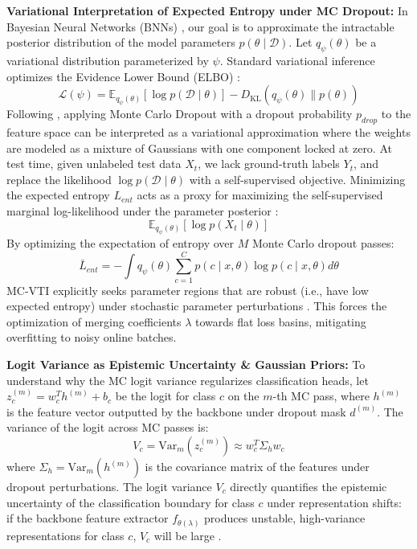 \documentclass{article}
\theoremstyle{plain}
\theoremstyle{definition}
\theoremstyle{remark}
\begin{document}
\textbf{Variational Interpretation of Expected Entropy under MC Dropout:}
In Bayesian Neural Networks (BNNs) \cite{gal2015bayesian,zhou2025bayesian}, our goal is to approximate the intractable posterior distribution of the model parameters $p(\theta \mid \mathcal{D})$. Let $q_\psi(\theta)$ be a variational distribution parameterized by $\psi$. Standard variational inference optimizes the Evidence Lower Bound (ELBO) \cite{gelberg2024variational,hubin2023variational,huix2022variational}:
\begin{equation}
  \mathcal{L}(\psi) = \mathbb{E}_{q_\psi(\theta)} [ \log p(\mathcal{D} \mid \theta) ] - D_{\text{KL}}(q_\psi(\theta) \parallel p(\theta))
\end{equation}
Following \cite{gal2015bayesian}, applying Monte Carlo Dropout with a dropout probability $p_{drop}$ to the feature space can be interpreted as a variational approximation where the weights are modeled as a mixture of Gaussians with one component locked at zero. 
At test time, given unlabeled test data $X_t$, we lack ground-truth labels $Y_t$, and replace the likelihood $\log p(\mathcal{D} \mid \theta)$ with a self-supervised objective. Minimizing the expected entropy $L_{ent}$ acts as a proxy for maximizing the self-supervised marginal log-likelihood under the parameter posterior \cite{lee2024entropy}:
\begin{equation}
  \mathbb{E}_{q_\psi(\theta)} [ \log p(X_t \mid \theta) ]
\end{equation}
By optimizing the expectation of entropy over $M$ Monte Carlo dropout passes:
\begin{equation}
  \bar{L}_{ent} = -\int q_\psi(\theta) \sum_{c=1}^C p(c \mid x, \theta) \log p(c \mid x, \theta) d\theta
\end{equation}
MC-VTI explicitly seeks parameter regions that are robust (i.e., have low expected entropy) under stochastic parameter perturbations \cite{guo2025smoothing,schodt2024framework}. This forces the optimization of merging coefficients $\lambda$ towards flat loss basins, mitigating overfitting to noisy online batches.

\textbf{Logit Variance as Epistemic Uncertainty \& Gaussian Priors:}
To understand why the MC logit variance regularizes classification heads, let $z^{(m)}_c = w_c^T h^{(m)} + b_c$ be the logit for class $c$ on the $m$-th MC pass, where $h^{(m)}$ is the feature vector outputted by the backbone under dropout mask $d^{(m)}$. The variance of the logit across MC passes is:
\begin{equation}
  V_c = \text{Var}_m(z^{(m)}_c) \approx w_c^T \Sigma_{h} w_c
\end{equation}
where $\Sigma_h = \text{Var}_m(h^{(m)})$ is the covariance matrix of the features under dropout perturbations. The logit variance $V_c$ directly quantifies the epistemic uncertainty of the classification boundary for class $c$ under representation shifts: if the backbone feature extractor $f_{\theta(\lambda)}$ produces unstable, high-variance representations for class $c$, $V_c$ will be large \cite{klanecek2023uncertainty}.
\end{document}
